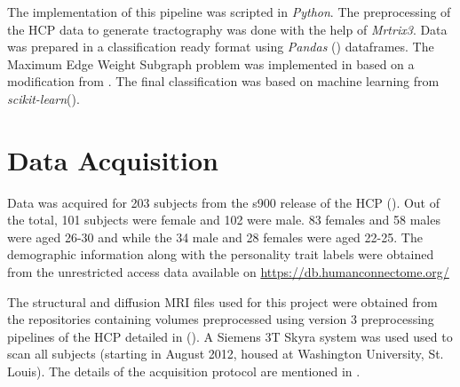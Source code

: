 \documentclass[msthesis.tex]{subfiles}
\begin{document}
The implementation of this pipeline was scripted in \textit{Python}. The preprocessing of the HCP data to generate tractography was done with the help of \textit{Mrtrix3}.  Data was prepared in a classification ready format using \textit{Pandas} (\cite{pandas_2020}) dataframes. The Maximum Edge Weight Subgraph problem was implemented in  based on a modification from \cite{DBLP:journals/corr/LobodaAS16}. The final classification was based on machine learning from \textit{scikit-learn}(\cite{sklearn_2012}). 

\section{Data Acquisition}
\label{sec:acquisition}
Data was acquired for 203 subjects from the s900 release of the HCP (\cite{hcp2015wu}). Out of the total, 101 subjects were female and 102 were male. 83 females and 58 males were aged 26-30 and while the 34 male and 28 females were aged 22-25. The demographic information along with the personality trait labels were obtained from the unrestricted access data available on \href{https://db.humanconnectome.org/}{https://db.humanconnectome.org/}


The structural and diffusion MRI files used for this project were obtained from the repositories containing volumes preprocessed using version 3 preprocessing pipelines of the HCP detailed in (\cite{GLASSER2013105}). A Siemens 3T Skyra system was used used to scan all subjects (starting in August 2012, housed at Washington University, St. Louis). The details of the acquisition protocol are mentioned in \cite{van2012human}.
\end{document}
